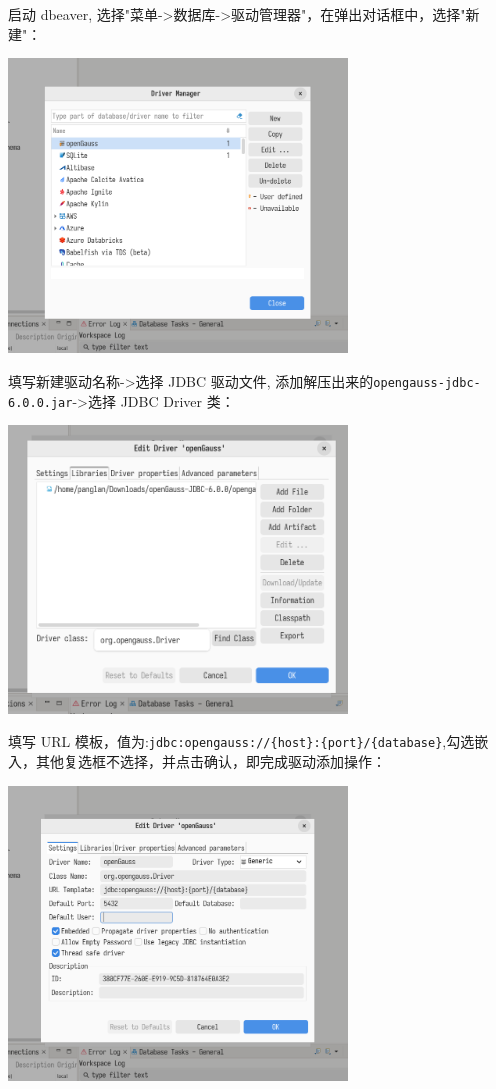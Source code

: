 \documentclass{article}
\begin{document}
启动 dbeaver, 选择"菜单->数据库->驱动管理器"，在弹出对话框中，选择"新建"：

\begin{center}
\includegraphics[width=9cm]{./image/1.png}
\end{center}

填写新建驱动名称->选择 JDBC 驱动文件, 添加解压出来的\verb|opengauss-jdbc-6.0.0.jar|->选择 JDBC Driver 类：

\begin{center}
\includegraphics[width=9cm]{./image/3.png}
\end{center}

填写 URL 模板，值为:\verb|jdbc:opengauss://{host}:{port}/{database}|,勾选嵌入，其他复选框不选择，并点击确认，即完成驱动添加操作：

\begin{center}
\includegraphics[width=9cm]{./image/2.png}
\end{center}
\end{document}

